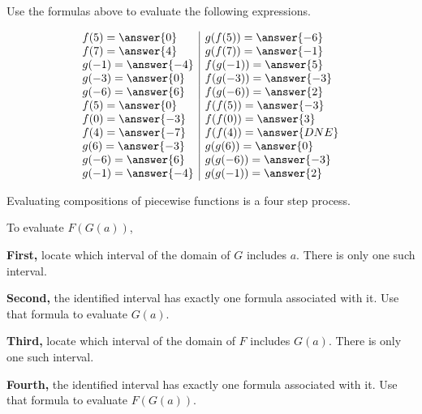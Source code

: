 \documentclass{ximera}
\begin{document}
\begin{question} 


Use the formulas above to evaluate the following expressions.



\[
\begin{array}{l|l}
f(5) = \answer{0}  & g(f(5)) = \answer{-6}   \\
f(7) = \answer{4}  & g(f(7)) = \answer{-1}   \\
g(-1) = \answer{-4}  & f(g(-1)) = \answer{5}   \\
g(-3) = \answer{0}  & f(g(-3)) = \answer{-3}   \\
g(-6) = \answer{6}  & f(g(-6)) = \answer{2}   \\
f(5) = \answer{0}  & f(f(5)) = \answer{-3}   \\
f(0) = \answer{-3}  & f(f(0)) = \answer{3}   \\
f(4) = \answer{-7}  & f(f(4)) = \answer{DNE}   \\
g(6) = \answer{-3}  & g(g(6)) = \answer{0}   \\
g(-6) = \answer{6}  & g(g(-6)) = \answer{-3}   \\
g(-1) = \answer{-4}  & g(g(-1)) = \answer{2}   \\
\end{array}
\]



\end{question}





Evaluating compositions of piecewise functions is a four step process.

To evaluate $F(G(a))$,


\textbf{\textcolor{red!75!green}{First,}} locate which interval of the domain of $G$ includes $a$. There is only one such interval. 


\textbf{\textcolor{red!75!green}{Second,}} the identified interval has exactly one formula associated with it. Use that formula to evaluate $G(a)$.


\textbf{\textcolor{red!75!green}{Third,}} locate which interval of the domain of $F$ includes $G(a)$. There is only one such interval. 

\textbf{\textcolor{red!75!green}{Fourth,}} the identified interval has exactly one formula associated with it. Use that formula to evaluate $F(G(a))$.
\end{document}
